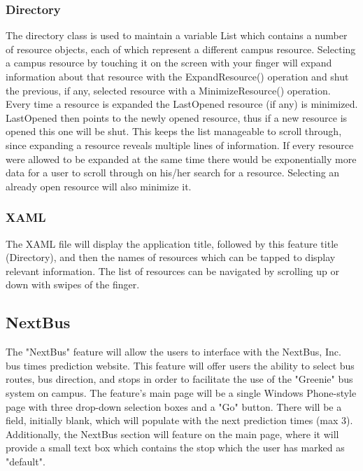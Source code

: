 \documentclass[pdftex,12pt,letter]{article}
\begin{document}
\subsubsection{Directory}
The directory class is used to maintain a variable List which contains a number of resource objects, each of which represent a different campus resource. Selecting a campus resource by touching it on the screen with your finger will expand information about that resource with the ExpandResource() operation and shut the previous, if any, selected resource with a MinimizeResource() operation. Every time a resource is expanded the LastOpened resource (if any) is minimized. LastOpened then points to the newly opened resource, thus if a new resource is opened this one will be shut. This keeps the list manageable to scroll through, since expanding a resource reveals multiple lines of information. If every resource were allowed to be expanded at the same time there would be exponentially more data for a user to scroll through on his/her search for a resource. Selecting an already open resource will also minimize it.
\subsubsection{XAML}
The XAML file will display the application title, followed by this feature title
(Directory), and then the names of resources which can be tapped to display relevant information. The list of resources can be navigated by scrolling up or down with swipes of the finger. 
\subsection{NextBus}
The "NextBus" feature will allow the users to interface with the NextBus, Inc. bus times prediction website. This feature will offer users the ability to select bus routes, bus direction, and stops in order to facilitate the use of the "Greenie" bus system on campus. The feature's main page will be a single Windows Phone-style page with three drop-down selection boxes and a "Go" button. There will be a field, initially blank, which will populate with the next prediction times (max 3). Additionally, the NextBus section will feature on the main page, where it will provide a small text box which contains the stop which the user has marked as "default".
\end{document}
